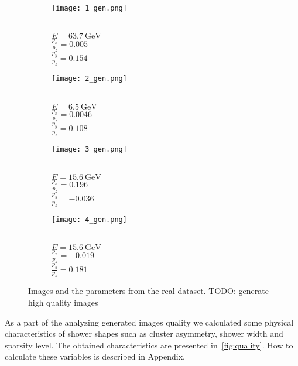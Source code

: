\documentclass{webofc}
\newcommand{\todo}[1]{{\color{blue}TODO: #1}}
\begin{document}
\begin{figure}
\captionsetup[subfigure]{justification=centering}
  \centering
  \begin{subfigure}{0.24\textwidth}
    \centering
    \texttt{[image: 1\_gen.png]}
    \caption{\\$E = 63.7~\text{GeV}$ \\ $\frac{p_x}{p_z}=0.005$ \\ $\frac{p_y}{p_z}=0.154$}\label{fig:gen-imgs-1}
  \end{subfigure}
  \begin{subfigure}{0.24\textwidth}
    \centering
    \texttt{[image: 2\_gen.png]}
    \caption{\\$E = 6.5~\text{GeV}$ \\  $\frac{p_x}{p_z}=0.0046$ \\$\frac{p_y}{p_z}=0.108$}\label{fig:gen-imgs-2}
  \end{subfigure}
    \begin{subfigure}{0.24\textwidth}
    \centering
    \texttt{[image: 3\_gen.png]}
    \caption{\\$E = 15.6~\text{GeV}$ \\ $\frac{p_x}{p_z}=0.196$ \\ $\frac{p_y}{p_z}=-0.036$}\label{fig:gen-imgs-3}
  \end{subfigure}
  \begin{subfigure}{0.24\textwidth}
    \centering
    \texttt{[image: 4\_gen.png]}
    \caption{\\$E = 15.6~\text{GeV}$ \\  $\frac{p_x}{p_z}=-0.019$ \\ $\frac{p_y}{p_z}=0.181$}\label{fig:gen-imgs-4}
  \end{subfigure}
  \caption{Images and the parameters from the real dataset. \todo{generate high quality images}}
  \label{fig:gen-imgs}
\end{figure}


As a part of the analyzing generated images quality we calculated some physical characteristics of shower shapes such as cluster asymmetry, shower width and sparsity level. The obtained characteristics are presented in~\cref{fig:quality}. How to calculate these variables is described in Appendix.
\end{document}
